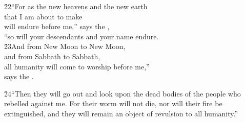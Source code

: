 \begin{poetry}
\poeml \v{22}``For as the new heavens and the new earth \\
\poemll    that I am about to make \\
\poeml will endure before me,'' says the , \\
\poemll    ``so will your descendants and your name endure. \\
\poeml \v{23}And from New Moon to New Moon, \\
\poemll    and from Sabbath to Sabbath, \\
\poeml all humanity will come to worship before me,'' \\
\poemll    says the .
\end{poetry}

\v{24}``Then they will go out and look upon the dead bodies of the people who rebelled against me. For their worm will not die, nor will their fire be extinguished, and they will remain an object of revulsion to all humanity.''
